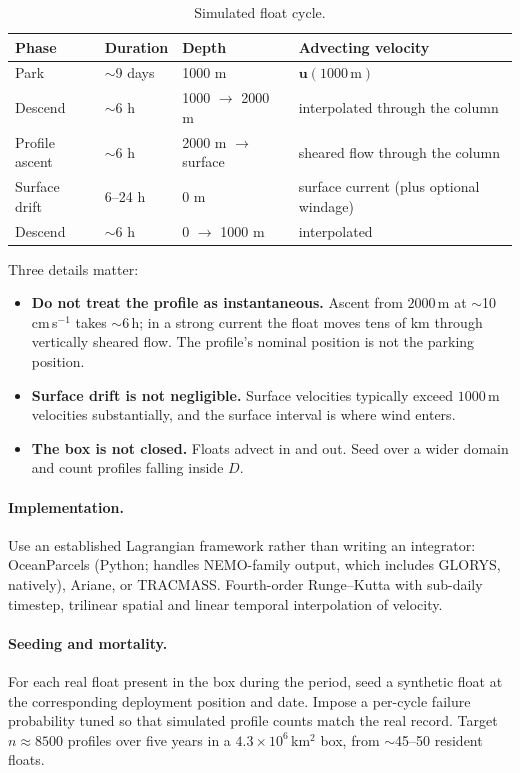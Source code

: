 \documentclass[11pt]{article}
\begin{document}
\begin{table}[h]
\centering
\begin{tabular}{llll}
\toprule
Phase & Duration & Depth & Advecting velocity \\
\midrule
Park & $\sim$9 days & 1000 m & $\mathbf{u}(1000\,\mathrm{m})$ \\
Descend & $\sim$6 h & 1000 $\to$ 2000 m & interpolated through the column \\
Profile ascent & $\sim$6 h & 2000 m $\to$ surface & sheared flow through the column \\
Surface drift & 6--24 h & 0 m & surface current (plus optional windage) \\
Descend & $\sim$6 h & 0 $\to$ 1000 m & interpolated \\
\bottomrule
\end{tabular}
\caption{Simulated float cycle.}
\end{table}

Three details matter:

\begin{itemize}[leftmargin=*]
  \item \textbf{Do not treat the profile as instantaneous.} Ascent from $2000$\,m at
        $\sim$10\,cm\,s$^{-1}$ takes $\sim$6\,h; in a strong current the float moves tens of km
        through vertically sheared flow. The profile's nominal position is not the parking
        position.
  \item \textbf{Surface drift is not negligible.} Surface velocities typically exceed
        $1000$\,m velocities substantially, and the surface interval is where wind enters.
  \item \textbf{The box is not closed.} Floats advect in and out. Seed over a wider domain and
        count profiles falling inside $D$.
\end{itemize}

\paragraph{Implementation.} Use an established Lagrangian framework rather than writing an
integrator: OceanParcels (Python; handles NEMO-family output, which includes GLORYS, natively),
Ariane, or TRACMASS. Fourth-order Runge--Kutta with sub-daily timestep, trilinear spatial and
linear temporal interpolation of velocity.

\paragraph{Seeding and mortality.} For each real float present in the box during the period,
seed a synthetic float at the corresponding deployment position and date. Impose a per-cycle
failure probability tuned so that simulated profile counts match the real record. Target
$n \approx 8500$ profiles over five years in a $4.3\times10^{6}$\,km$^2$ box, from $\sim$45--50
resident floats.
\end{document}
